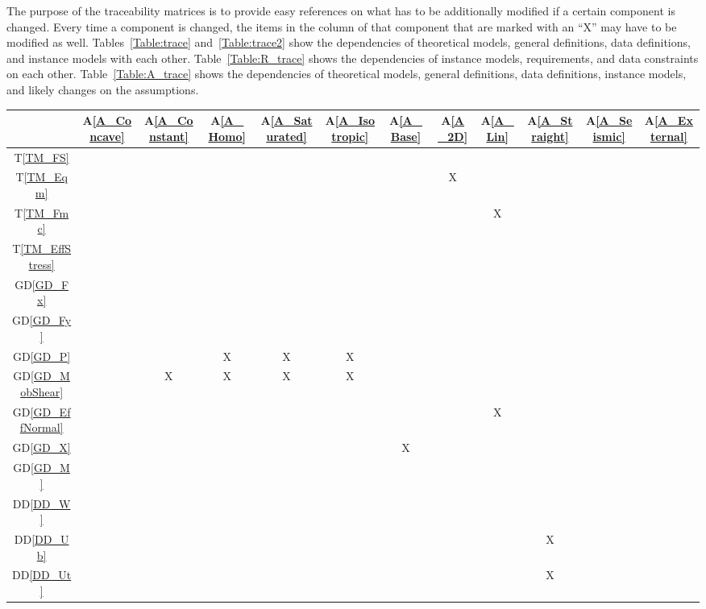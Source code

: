 \documentclass[12pt]{article}
\newcommand{\aref}[1]{A\ref{#1}}
\newcommand{\tref}[1]{T\ref{#1}}
\newcommand{\ddref}[1]{DD\ref{#1}}
\newcommand{\dref}[1]{GD\ref{#1}}
\begin{document}
The purpose of the traceability matrices is to provide easy references on what
has to be additionally modified if a certain component is changed.  Every time a
component is changed, the items in the column of that component that are marked
with an ``X'' may have to be modified as well.  Tables~\ref{Table:trace} 
and~\ref{Table:trace2} show the dependencies of theoretical models, general 
definitions, data definitions, and instance models with each other. 
Table~\ref{Table:R_trace} shows the dependencies of instance models, 
requirements, and data constraints on each other. Table~\ref{Table:A_trace} 
shows the dependencies of theoretical models, general definitions, data 
definitions, instance models, and likely changes on the assumptions.

\setlength{\tabcolsep}{6pt}

\begin{table}[h!]
\centering
\begin{tabular}{|c|c|c|c|c|c|c|c|c|c|c|c|}
\hline
& \aref{A_Concave}& \aref{A_Constant}& \aref{A_Homo}& \aref{A_Saturated}&
\aref{A_Isotropic}& \aref{A_Base}& \aref{A_2D}& \aref{A_Lin}& 
\aref{A_Straight}& \aref{A_Seismic}& \aref{A_External} \\
\hline
\tref{TM_FS}            & & & & & & & & & & & \\ \hline
\tref{TM_Eqm}           & & & & & & & X& & & & \\ \hline
\tref{TM_Fmc}           & & & & & & & & X& & & \\ \hline
\tref{TM_EffStress}     & & & & & & & & & & & \\ \hline
\dref{GD_Fx}            & & & & & & & & & & & \\ \hline
\dref{GD_Fy}            & & & & & & & & & & & \\ \hline
\dref{GD_P}             & & & X& X& X& & & & & & \\ \hline
\dref{GD_MobShear}      & & X& X& X& X& & & & & & \\ \hline
\dref{GD_EffNormal}     & & & & & & & & X& & & \\ \hline
\dref{GD_X}             & & & & & & X& & & & & \\ \hline
\dref{GD_M}             & & & & & & & & & & & \\ \hline
\ddref{DD_W}            & & & & & & & & & & & \\ \hline
\ddref{DD_Ub}           & & & & & & & & & X& & \\ \hline
\ddref{DD_Ut}           & & & & & & & & & X& & \\ \hline

\end{tabular}
\end{table}
\end{document}
